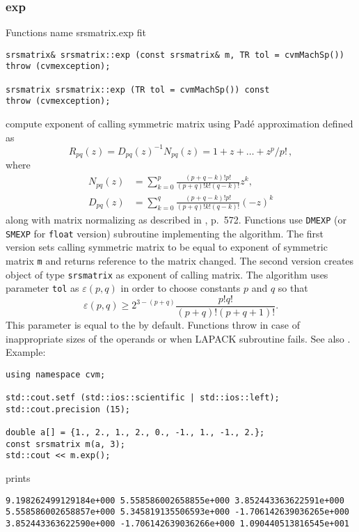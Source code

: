 \subsubsection{exp}
Functions%
\pdfdest name {srsmatrix.exp} fit
\begin{verbatim}
srsmatrix& srsmatrix::exp (const srsmatrix& m, TR tol = cvmMachSp())
throw (cvmexception);

srsmatrix srsmatrix::exp (TR tol = cvmMachSp()) const
throw (cvmexception);
\end{verbatim}
compute  exponent of  calling symmetric matrix using Pad\'e approximation
defined as
\begin{equation*}
R_{pq}(z)=D_{pq}(z)^{-1}N_{pq}(z)=1+z+\dots+z^p/p!\,,
\end{equation*}
where
\begin{align*}
N_{pq}(z)&=\sum_{k=0}^p\frac{(p+q-k)!p!}{(p+q)!k!(q-k)!}z^k,\\
D_{pq}(z)&=\sum_{k=0}^q\frac{(p+q-k)!p!}{(p+q)!k!(q-k)!}(-z)^k
\end{align*}
along with  matrix normalizing as described in
, p.~572.
Functions use \verb"DMEXP" (or \verb"SMEXP" for \verb"float" version)
\FORTRAN subroutine implementing the algorithm.
The first version sets  calling symmetric matrix to be equal to
 exponent of symmetric matrix \verb"m" and returns 
 reference to the matrix
changed. The second version
creates  object of type \verb"srsmatrix" as 
exponent of  calling matrix.
The algorithm uses parameter \verb"tol"
as $\varepsilon(p,q)$ in order to choose constants $p$ and $q$
so that
\begin{equation*}
\varepsilon(p,q)\ge 2^{3-(p+q)}\frac{p!q!}{(p+q)!(p+q+1)!}.
\end{equation*}
This parameter is equal to the
 by default.
Functions throw   
in case of
inappropriate sizes of the operands or when LAPACK subroutine fails.
See also
.
Example:
\begin{Verbatim}
using namespace cvm;

std::cout.setf (std::ios::scientific | std::ios::left); 
std::cout.precision (15);

double a[] = {1., 2., 1., 2., 0., -1., 1., -1., 2.};
const srsmatrix m(a, 3);
std::cout << m.exp();
\end{Verbatim}
prints
\begin{Verbatim}
9.198262499129184e+000 5.558586002658855e+000 3.852443363622591e+000
5.558586002658857e+000 5.345819135506593e+000 -1.706142639036265e+000
3.852443363622590e+000 -1.706142639036266e+000 1.090440513816545e+001
\end{Verbatim}
